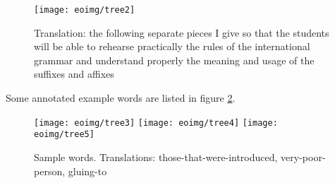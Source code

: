 \documentclass[10pt,a4paper]{article}
\begin{document}
\begin{figure}
\centering
\texttt{[image: eoimg/tree2]}
\caption{Translation: the following separate pieces I give so that the students
will be able to rehearse practically the rules of the international grammar and understand properly the meaning and usage of the suffixes and affixes}
\label{s2}
\end{figure}

Some annotated example words are listed in figure \ref{w1}.

\begin{comment}
\begin{verbatim}
(JJ (JJ (V (V (P en) (V konduk)) (V it)) a) j)

(NN (N (J (J (A mal) (J riĉ)) (A eg)) (A ul)) o)

(VB (P al) (VB (V glu) i))
\end{verbatim}
\end{comment}

\begin{figure}
\texttt{[image: eoimg/tree3]}
\texttt{[image: eoimg/tree4]}
\texttt{[image: eoimg/tree5]}
\caption{Sample words. Translations: those-that-were-introduced, 
very-poor-person, gluing-to}
\label{w1}
\end{figure}
\end{document}
